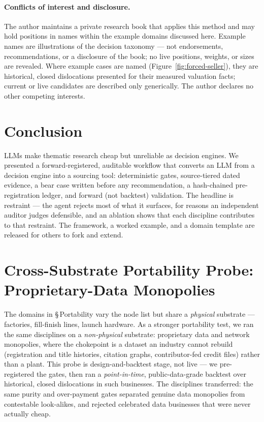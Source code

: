 \documentclass[11pt]{article}
\begin{document}
\paragraph{Conflicts of interest and disclosure.} The author maintains a private research book that
applies this method and may hold positions in names within the example domains discussed here.
Example names are illustrations of the decision taxonomy --- not endorsements, recommendations, or a
disclosure of the book; no live positions, weights, or sizes are revealed. Where example
cases are named (Figure~\ref{fig:forced-seller}), they are historical, closed dislocations
presented for their measured valuation facts; current or live candidates are described
only generically. The author declares no other competing interests.

\section{Conclusion}
LLMs make thematic research cheap but unreliable as decision engines. We presented a
forward-registered, auditable workflow that converts an LLM from a decision engine into a sourcing
tool: deterministic gates, source-tiered dated evidence, a bear case written before any
recommendation, a hash-chained pre-registration ledger, and forward (not backtest) validation. The
headline is restraint --- the agent rejects most of what it surfaces, for reasons an independent
auditor judges defensible, and an ablation shows that each discipline contributes to that restraint.
The framework, a worked example, and a domain template are released for others to fork and extend.

\appendix
\section{Cross-Substrate Portability Probe: Proprietary-Data Monopolies}
\label{app:substrate}

The domains in \S\,Portability vary the node list but share a \emph{physical} substrate ---
factories, fill-finish lines, launch hardware. As a stronger portability test, we ran the same
disciplines on a \emph{non-physical} substrate: proprietary data and network monopolies, where the
chokepoint is a dataset an industry cannot rebuild (registration and title histories, citation
graphs, contributor-fed credit files) rather than a plant. This probe is design-and-backtest stage,
not live --- we pre-registered the gates, then ran a \emph{point-in-time}, public-data-grade backtest
over historical, closed dislocations in such businesses. The disciplines transferred: the same purity
and over-payment gates separated genuine data monopolies from contestable look-alikes, and rejected
celebrated data businesses that were never actually cheap.
\end{document}
